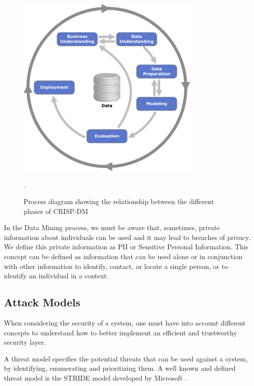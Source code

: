 \begin{figure}[!ht]
  \centering
  \includegraphics[width=0.80\textwidth]{images/CRISP-DM_Process_Diagram.png}
  \caption{Process diagram showing the relationship between the different phases of CRISP-DM \cite{wirth2000crisp}}.
  \label{fig:crisp-dm}
\end{figure}



In the Data Mining process, we must be aware that, sometimes, private information about individuals can be used and it may lead to breaches of privacy. We define this private information as \ac{PII} or Sensitive Personal Information. This concept can be defined as information that can be used alone or in conjunction with other information to identify, contact, or locate a single person, or to identify an individual in a context.



\subsection{Attack Models}
\label{ssec:AttackModels}

When considering the security of a system, one must have into account different concepts to understand how to better implement an efficient and trustworthy security layer.

A threat model specifies the potential threats that can be used against a system, by identifying, enumerating and prioritizing them. A well known and defined threat model is the STRIDE model developed by Microsoft \cite{hafiz2007organizing}.

